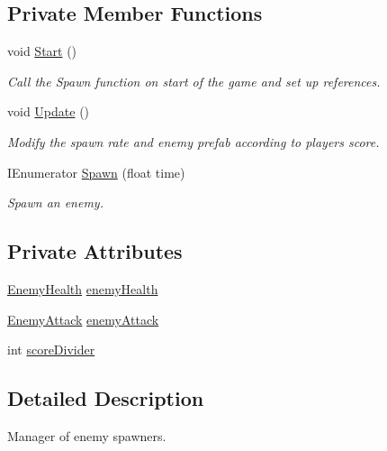 \subsection*{Private Member Functions}
\begin{DoxyCompactItemize}
\item 
void \mbox{\hyperlink{class_spawn_manager_a6ff60868f646f56a7cbef6d0f1e272ff}{Start}} ()
\begin{DoxyCompactList}\small\item\em Call the Spawn function on start of the game and set up references. \end{DoxyCompactList}\item 
void \mbox{\hyperlink{class_spawn_manager_afbe4ba82b4859ad2510c1a175e230317}{Update}} ()
\begin{DoxyCompactList}\small\item\em Modify the spawn rate and enemy prefab according to player\textquotesingle{}s score. \end{DoxyCompactList}\item 
I\+Enumerator \mbox{\hyperlink{class_spawn_manager_a782e3638027c192b98a70eda45bbf55a}{Spawn}} (float time)
\begin{DoxyCompactList}\small\item\em Spawn an enemy. \end{DoxyCompactList}\end{DoxyCompactItemize}
\subsection*{Private Attributes}
\begin{DoxyCompactItemize}
\item 
\mbox{\hyperlink{class_enemy_health}{Enemy\+Health}} \mbox{\hyperlink{class_spawn_manager_a9d0bb95f08bec927e6c1bc5b9d5867dc}{enemy\+Health}}
\item 
\mbox{\hyperlink{class_enemy_attack}{Enemy\+Attack}} \mbox{\hyperlink{class_spawn_manager_ae0d3001eb2a5db246a350131ed9ad609}{enemy\+Attack}}
\item 
int \mbox{\hyperlink{class_spawn_manager_afeb5277ecfc19f64c5cbe1e88054d448}{score\+Divider}}
\end{DoxyCompactItemize}


\subsection{Detailed Description}
Manager of enemy spawners. 

